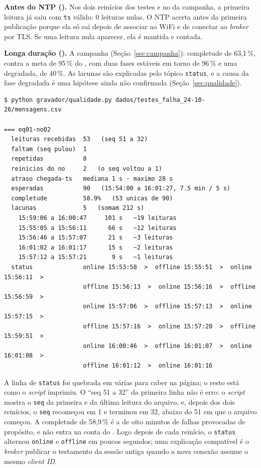\textbf{Antes do NTP ().} Nos dois reinícios dos testes e no da
campanha, a primeira leitura já saiu com \texttt{ts} válido: 0 leituras
nulas. O NTP acerta antes da primeira publicação porque ela só sai
depois de associar ao WiFi e de conectar ao \emph{broker} por TLS. Se
uma leitura nula aparecer, ela é mantida e contada.

\textbf{Longa duração ().} A campanha (Seção~\ref{sec:campanha}):
completude de 63,1\,\%, contra a meta de 95\,\% do , com duas
fases estáveis em torno de 96\,\% e uma degradada, de 40\,\%. As
lacunas são explicadas pelo tópico \texttt{status}, e a causa da fase
degradada é uma hipótese ainda não confirmada (Seção~\ref{sec:qualidade}).

\begin{lstlisting}[style=terminal,
  caption={Saída do \texttt{qualidade.py} sobre o CSV dos testes de falha (só a linha de \texttt{status} foi quebrada)},
  label={lst:qualidade-testes}]
$ python gravador/qualidade.py dados/testes_falha_24-10-26/mensagens.csv

=== eq01-no02
  leituras recebidas  53   (seq 51 a 32)
  faltam (seq pulou)  1
  repetidas           0
  reinicios do no     2   (o seq voltou a 1)
  atraso chegada-ts   mediana 1 s · maximo 28 s
  esperadas           90   (15:54:00 a 16:01:27, 7.5 min / 5 s)
  completude          58.9%   (53 unicas de 90)
  lacunas             5   (somam 212 s)
    15:59:06 a 16:00:47     101 s   ~19 leituras
    15:55:05 a 15:56:11      66 s   ~12 leituras
    15:56:46 a 15:57:07      21 s   ~3 leituras
    16:01:02 a 16:01:17      15 s   ~2 leituras
    15:57:12 a 15:57:21       9 s   ~1 leituras
  status              online 15:53:58  >  offline 15:55:51  >  online 15:56:11  >
                      offline 15:56:13  >  online 15:56:16  >  offline 15:56:59  >
                      online 15:57:06  >  offline 15:57:13  >  online 15:57:15  >
                      offline 15:57:16  >  online 15:57:20  >  offline 15:59:51  >
                      online 16:00:46  >  offline 16:01:07  >  online 16:01:08  >
                      offline 16:01:12  >  online 16:01:16
\end{lstlisting}

\noindent A linha de \texttt{status} foi quebrada em várias para caber
na página; o resto está como o \emph{script} imprimiu. O \enquote{seq 51
a 32} da primeira linha não é erro: o \emph{script} mostra o
\texttt{seq} da primeira e da última leitura do arquivo, e, depois dos
dois reinícios, o \texttt{seq} recomeçou em 1 e terminou em 32, abaixo
do 51 em que o arquivo começou. A completude de
58,9\,\% é a de oito minutos de falhas provocadas de propósito, e não
entra na conta do . Logo depois de cada reinício, o
\texttt{status} alternou \texttt{online} e \texttt{offline} em poucos
segundos; uma explicação compatível é o \emph{broker} publicar o
testamento da sessão antiga quando a nova conexão assume o mesmo
\emph{client ID}.

